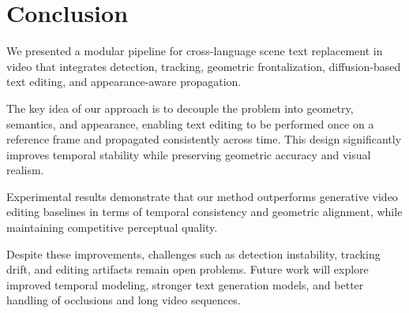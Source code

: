 \section{Conclusion}

We presented a modular pipeline for cross-language scene text replacement in video that integrates detection, tracking, geometric frontalization, diffusion-based text editing, and appearance-aware propagation.

The key idea of our approach is to decouple the problem into geometry, semantics, and appearance, enabling text editing to be performed once on a reference frame and propagated consistently across time. This design significantly improves temporal stability while preserving geometric accuracy and visual realism.

Experimental results demonstrate that our method outperforms generative video editing baselines in terms of temporal consistency and geometric alignment, while maintaining competitive perceptual quality.

Despite these improvements, challenges such as detection instability, tracking drift, and editing artifacts remain open problems. Future work will explore improved temporal modeling, stronger text generation models, and better handling of occlusions and long video sequences.
